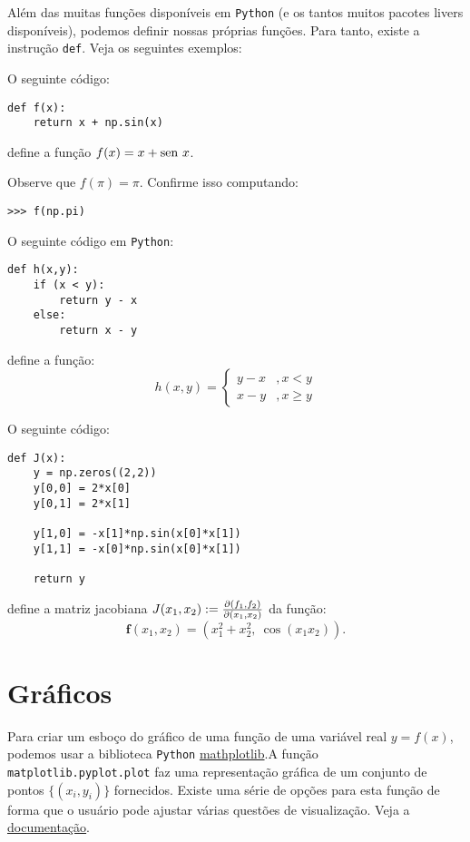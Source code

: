 Além das muitas funções disponíveis em \verb+Python+ (e os tantos muitos pacotes livers disponíveis), podemos definir nossas próprias funções. Para tanto, existe a instrução \verb+def+. Veja os seguintes exemplos:

\begin{ex}
  O seguinte código:
\begin{verbatim}
def f(x): 
    return x + np.sin(x)
\end{verbatim}
define a função $f(x) = x + \operatorname{sen}\, x$.

Observe que $f(\pi) = \pi$. Confirme isso computando:
\begin{verbatim}
>>> f(np.pi)
\end{verbatim}
\end{ex}

\begin{ex}
  O seguinte código em \verb+Python+:
\begin{verbatim}
def h(x,y):
    if (x < y):
        return y - x
    else:
        return x - y
\end{verbatim}
define a função:
\begin{equation*}
  h(x,y) = \left\{
    \begin{array}{ll}
      y - x &, x < y\\
      x - y &, x \geq y
    \end{array}
\right.
\end{equation*}
\end{ex}

\begin{ex}
  O seguinte código:
\begin{verbatim}
def J(x):
    y = np.zeros((2,2))
    y[0,0] = 2*x[0]
    y[0,1] = 2*x[1]

    y[1,0] = -x[1]*np.sin(x[0]*x[1])
    y[1,1] = -x[0]*np.sin(x[0]*x[1])

    return y
\end{verbatim}
define a matriz jacobiana $J(x_1,x_2) := \frac{\partial(f_1,f_2)}{\partial(x_1,x_2)}$ da função:
\begin{equation*}
  \pmb{f}(x_1,x_2) = (x_1^2 + x_2^2,~\cos(x_1x_2)).
\end{equation*}
\end{ex}

\section{Gráficos}

Para criar um esboço do gráfico de uma função de uma variável real $y = f(x)$, podemos usar a biblioteca \verb+Python+ \href{http://matplotlib.org/}{mathplotlib}.A função \verb+matplotlib.pyplot.plot+ faz uma representação gráfica de um conjunto de pontos $\{(x_i, y_i)\}$ fornecidos. Existe uma série de opções para esta função de forma que o usuário pode ajustar várias questões de visualização. Veja a \href{http://matplotlib.org/api/pyplot_api.html?highlight=pyplot.plot#matplotlib.pyplot.plot}{documentação}.

